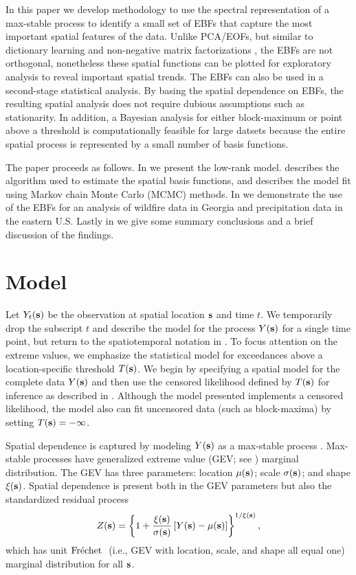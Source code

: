 In this paper we develop methodology to use the spectral representation of a max-stable process to identify a small set of EBFs that capture the most important spatial features of the data.
Unlike PCA/EOFs, but similar to dictionary learning \citep{Mairal2014} and non-negative matrix factorizations \citep{Lee1999}, the EBFs are not orthogonal, nonetheless these spatial functions can be plotted for exploratory analysis to reveal important spatial trends.
The EBFs can also be used in a second-stage statistical analysis.
By basing the spatial dependence on EBFs, the resulting spatial analysis does not require dubious assumptions such as stationarity.
In addition, a Bayesian analysis for either block-maximum or point above a threshold is computationally feasible for large datsets because the entire spatial process is represented by a small number of basis functions.

The paper proceeds as follows. In  we present the low-rank model.  describes the algorithm used to estimate the spatial basis functions, and  describes the model fit using Markov chain Monte Carlo (MCMC) methods. In  we demonstrate the use of the EBFs for an analysis of wildfire data in Georgia and precipitation data in the eastern U.S. Lastly in  we give some summary conclusions and a brief discussion of the findings.

\section{Model}\label{ebs:model}

Let $Y_{t}(\mathbf{s})$ be the observation at spatial location $\mathbf{s}$ and time $t$.  We temporarily drop the subscript $t$ and describe the model for the process $Y(\mathbf{s})$ for a single time point, but return to the spatiotemporal notation in .
To focus attention on the extreme values, we emphasize the statistical model for exceedances above a location-specific threshold $T(\mathbf{s})$.
We begin by specifying a spatial model for the complete data $Y(\mathbf{s})$ and then use the censored likelihood defined by $T(\mathbf{s})$ for inference as described in .
Although the model presented implements a censored likelihood, the model also can fit uncensored data (such as block-maxima) by setting $T(\mathbf{s}) = -\infty$.

Spatial dependence is captured by modeling $Y(\mathbf{s})$ as a max-stable process \citep{deHaan2006}.
Max-stable processes have generalized extreme value (GEV; see ) marginal distribution.
The GEV has three parameters: location $\mu(\mathbf{s})$; scale $\sigma(\mathbf{s})$; and shape $\xi(\mathbf{s})$.
Spatial dependence is present both in the GEV parameters but also the standardized residual process
\begin{align} \label{ebeq:Y2Z}
 Z(\mathbf{s}) = \left\{1+\frac{\xi(\mathbf{s})}{\sigma(\mathbf{s})}\left[Y(\mathbf{s}) - \mu(\mathbf{s})\right]\right\}^{1/\xi(\mathbf{s})},
\end{align}
which has unit $\mbox{Fr$\acute{\mbox{e}}$chet }$ (i.e., GEV with location, scale, and shape all equal one) marginal distribution for all $\mathbf{s}$.

